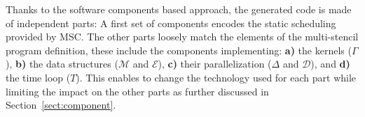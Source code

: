 Thanks to the software components based approach, the generated code is made of independent parts:
A first set of components encodes the static scheduling provided by MSC.
The other parts loosely match the elements of the multi-stencil program definition, these include the components implementing: \textbf{a)} the kernels ($\Gamma$), \textbf{b)} the data structures ($\mathcal{M}$ and $\mathcal{E}$), \textbf{c)} their parallelization ($\Delta$ and $\mathcal{D}$), and \textbf{d)} the time loop ($T$).
This enables to change the technology used for each part while limiting the impact on the other parts as further discussed in Section~\ref{sect:component}.






 

